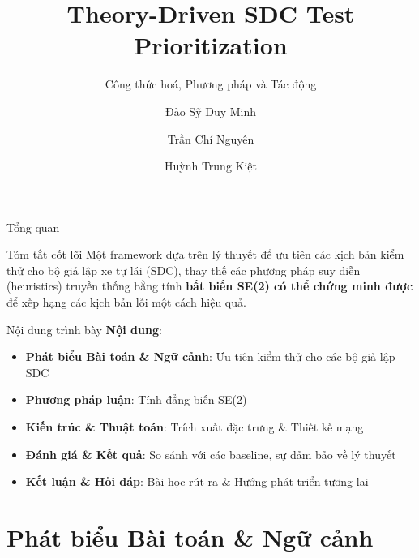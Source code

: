 \documentclass[aspectratio=169,10pt]{beamer}
\title{Theory-Driven SDC Test Prioritization}
\subtitle{Công thức hoá, Phương pháp và Tác động}
\author{Đào Sỹ Duy Minh \and Trần Chí Nguyên \and Huỳnh Trung Kiệt}
\institute{Trường Đại học Khoa học Tự nhiên, ĐHQG-HCM}
\date{}
\begin{document}
\begin{frame}
\maketitle
\end{frame}

\begin{frame}{Tổng quan}
\begin{block}{Tóm tắt cốt lõi}
Một framework dựa trên lý thuyết để ưu tiên các kịch bản kiểm thử cho bộ giả lập xe tự lái (SDC), thay thế các phương pháp suy diễn (heuristics) truyền thống bằng tính \textbf{bất biến SE(2) có thể chứng minh được} để xếp hạng các kịch bản lỗi một cách hiệu quả.
\end{block}
\end{frame}

\begin{frame}{Nội dung trình bày}
\textbf{Nội dung}:
\begin{itemize}
    \item \textbf{Phát biểu Bài toán \& Ngữ cảnh}: Ưu tiên kiểm thử cho các bộ giả lập SDC
    \item \textbf{Phương pháp luận}: Tính đẳng biến SE(2)
    \item \textbf{Kiến trúc \& Thuật toán}: Trích xuất đặc trưng \& Thiết kế mạng
    \item \textbf{Đánh giá \& Kết quả}: So sánh với các baseline, sự đảm bảo về lý thuyết
    \item \textbf{Kết luận \& Hỏi đáp}: Bài học rút ra \& Hướng phát triển tương lai
\end{itemize}
\end{frame}

\section{Phát biểu Bài toán \& Ngữ cảnh}
\end{document}
